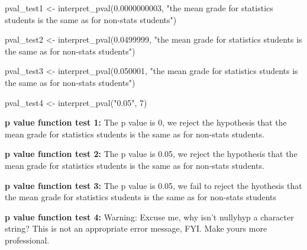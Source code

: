 \documentclass[
  openany]{book}
\newenvironment{Shaded}{\begin{snugshade}}{\end{snugshade}}
\newcommand{\DecValTok}[1]{\textcolor[rgb]{0.00,0.00,0.81}{#1}}
\newcommand{\FloatTok}[1]{\textcolor[rgb]{0.00,0.00,0.81}{#1}}
\newcommand{\FunctionTok}[1]{\textcolor[rgb]{0.00,0.00,0.00}{#1}}
\newcommand{\NormalTok}[1]{#1}
\newcommand{\OtherTok}[1]{\textcolor[rgb]{0.56,0.35,0.01}{#1}}
\newcommand{\StringTok}[1]{\textcolor[rgb]{0.31,0.60,0.02}{#1}}
\begin{document}
\begin{Shaded}
\begin{Highlighting}[]
\NormalTok{pval\_test1 }\OtherTok{\textless{}{-}} \FunctionTok{interpret\_pval}\NormalTok{(}\FloatTok{0.0000000003}\NormalTok{, }
                             \StringTok{"the mean grade for statistics students is the same as for non{-}stats students"}\NormalTok{)}

\NormalTok{pval\_test2 }\OtherTok{\textless{}{-}} \FunctionTok{interpret\_pval}\NormalTok{(}\FloatTok{0.0499999}\NormalTok{, }
                             \StringTok{"the mean grade for statistics students is the same as for non{-}stats students"}\NormalTok{)}

\NormalTok{pval\_test3 }\OtherTok{\textless{}{-}} \FunctionTok{interpret\_pval}\NormalTok{(}\FloatTok{0.050001}\NormalTok{, }
                             \StringTok{"the mean grade for statistics students is the same as for non{-}stats students"}\NormalTok{)}

\NormalTok{pval\_test4 }\OtherTok{\textless{}{-}} \FunctionTok{interpret\_pval}\NormalTok{(}\StringTok{"0.05"}\NormalTok{, }\DecValTok{7}\NormalTok{)}
\end{Highlighting}
\end{Shaded}

\textbf{p value function test 1:} The p value is 0, we reject the hypothesis that the mean grade for statistics students is the same as for non-stats students.

\textbf{p value function test 2:} The p value is 0.05, we reject the hypothesis that the mean grade for statistics students is the same as for non-stats students.

\textbf{p value function test 3:} The p value is 0.05, we fail to reject the hyothesis that the mean grade for statistics students is the same as for non-stats students

\textbf{p value function test 4:}
Warning: Excuse me, why isn't nullyhyp a character string?
This is not an appropriate error message, FYI.
Make yours more professional.
\end{document}
